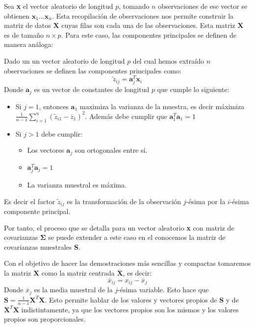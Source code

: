 \noindent Sea \textbf{x} el vector aleatorio de longitud $p$, tomando $n$ observaciones de ese vector se obtienen $\textbf{x}_1\ldots \textbf{x}_n$.
Esta recopilación de observaciones nos permite construir la matriz de datos $\textbf{X}$ cuyas filas son cada una de las observaciones. Esta matriz \textbf{X} es de tamaño $n\times p$. 
Para este caso, las componentes principales se definen de manera análoga:
\begin{defi}
Dado un un vector aleatorio de longitud $p$ del cual hemos extraído $n$ observaciones se definen las componentes principales como:
\begin{equation}
\widetilde{z}_{ij}=\textbf{a}^T_j\textbf{x}_i
\end{equation}
Donde $\textbf{a}_j$ es un vector de constantes de longitud $p$ que cumple lo siguiente:
\begin{itemize}
\item Si $j=1$, entonces $\textbf{a}_1$ maximiza la varianza de la muestra, es decir máximiza $\frac{1}{n-1}\sum_{i=1}^{n}(\widetilde{z}_{i1}-\overline{z}_1)^2$. Además debe cumplir que $\textbf{a}_1^T\textbf{a}_1=1$
\item Si $j>1$ debe cumplir:
\begin{itemize}
\item Los vectores $\textbf{a}_j$ son ortogonales entre sí. 
\item $\textbf{a}_j^T \textbf{a}_j=1$
\item La varianza muestral es máxima. 
\end{itemize}
\end{itemize}
Es decir el factor $\widetilde{z}_{ij}$ es la transformación de la observación $j$-ésima por la $i$-ésima componente principal. 
 
\end{defi}

\noindent Por tanto, el proceso que se detalla para un vector aleatorio \textbf{x} con matriz de covarianzas $\mathbf{\Sigma}$ se puede extender a este caso en el conocemos la matriz de covarianzas muestrales \textbf{S}.

\noindent Con el objetivo de hacer las demostraciones más sencillas y compactas tomaremos la matriz $\textbf{X}$ como la matriz centrada $\overline{\textbf{X}}$, es decir: 
\begin{equation}
\overline{x}_{ij}=x_{ij}-\overline{x}_j
\end{equation}
Donde $\overline{x}_j$ es la media muestral de la $j$-ésima variable. Esto hace que $\textbf{S}=\frac{1}{n-1}\textbf{X}^T\textbf{X}$. Esto permite hablar de los valores y vectores propios de \textbf{S} y de $\textbf{X}^T \textbf{X}$ indistintamente, ya que los vectores propios son los mismos y los valores propios son proporcionales. 

